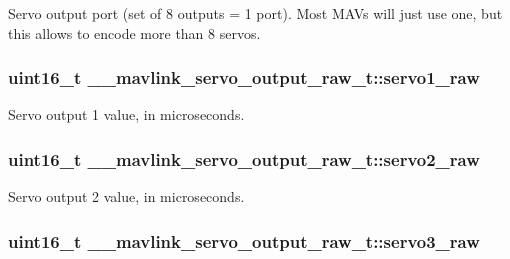 Servo output port (set of 8 outputs = 1 port). Most M\+A\+Vs will just use one, but this allows to encode more than 8 servos. 

\hypertarget{struct____mavlink__servo__output__raw__t_a5651abf79f8df0da7407b2329fedcdb2}{
\subsubsection[{servo1\+\_\+raw}]{\setlength{\rightskip}{0pt plus 5cm}uint16\+\_\+t \+\_\+\+\_\+mavlink\+\_\+servo\+\_\+output\+\_\+raw\+\_\+t\+::servo1\+\_\+raw}}\label{struct____mavlink__servo__output__raw__t_a5651abf79f8df0da7407b2329fedcdb2}


Servo output 1 value, in microseconds. 

\hypertarget{struct____mavlink__servo__output__raw__t_aa19900df91d866a507cf3261d4b6aeda}{
\subsubsection[{servo2\+\_\+raw}]{\setlength{\rightskip}{0pt plus 5cm}uint16\+\_\+t \+\_\+\+\_\+mavlink\+\_\+servo\+\_\+output\+\_\+raw\+\_\+t\+::servo2\+\_\+raw}}\label{struct____mavlink__servo__output__raw__t_aa19900df91d866a507cf3261d4b6aeda}


Servo output 2 value, in microseconds. 

\hypertarget{struct____mavlink__servo__output__raw__t_a8aa15f79b56b08694b77bfa6d1788554}{
\subsubsection[{servo3\+\_\+raw}]{\setlength{\rightskip}{0pt plus 5cm}uint16\+\_\+t \+\_\+\+\_\+mavlink\+\_\+servo\+\_\+output\+\_\+raw\+\_\+t\+::servo3\+\_\+raw}}\label{struct____mavlink__servo__output__raw__t_a8aa15f79b56b08694b77bfa6d1788554}


